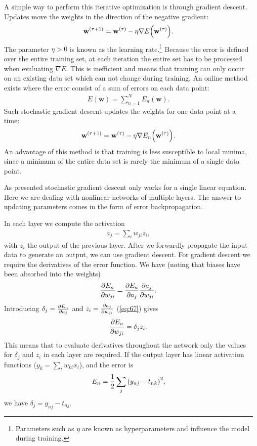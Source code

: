 \documentclass[11pt, a4paper]{report} %
\begin{document}
A simple way to perform this iterative optimization is through gradient descent.
Updates move the weights in the direction of the negative gradient:
\begin{align}
  \label{eq:63}
  \mathbf{w}^{(\tau+1)}=\mathbf{w}^{(\tau)}- \eta \nabla E\qty(\mathbf{w}^{(\tau)}).
\end{align}
The parameter \(\eta > 0\) is known as the learning rate.\footnote{Parameters such as \(\eta\) are known as hyperparameters and influence the model during training.}
Because the error is defined over the entire training set, at each iteration the entire set has to be processed when evaluating \(\nabla E\).
This is inefficient and means that training can only occur on an existing data set which can not change during training.
An online method exists where the error consist of a sum of errors on each data point:
\begin{align}
  \label{eq:64}
  E(\mathbf{w}) = \sum_{n=1}^{N} E_n(\mathbf{w}).
\end{align}
Such stochastic gradient descent updates the weights for one data point at a time:
\begin{align}
  \label{eq:65}
    \mathbf{w}^{(\tau+1)}=\mathbf{w}^{(\tau)}- \eta \nabla E_n\qty(\mathbf{w}^{(\tau)}).
\end{align}
An advantage of this method is that training is less susceptible to local minima, since a minimum of the entire data set is rarely the minimum of a single data point.

As presented stochastic gradient descent only works for a single linear equation.
Here we are dealing with nonlinear networks of multiple layers.
The answer to updating parameters comes in the form of error backpropagation.

In each layer we compute the activation
\begin{align}
  \label{eq:67}
  a_j= \sum_i w_{ji}z_i,
\end{align}
with \(z_i\) the output of the previous layer.
After we forwardly propagate the input data to generate an output, we can use gradient descent.
For gradient descent we require the derivatives of the error function.
We have (noting that biases have been absorbed into the weights)
\begin{align}
  \label{eq:66}
  \pdv{E_n}{w_{ji}} = \pdv{E_n}{a_j}\pdv{a_j}{w_{ji}}.
\end{align}
Introducing \(\delta_j = \pdv{E_n}{a_j}\) and \(z_i=\pdv{a_j}{w_{ji}}\) (\cref{eq:67}) gives
\begin{align}
  \label{eq:68}
  \pdv{E_n}{w_{ji}} = \delta_j z_i.
\end{align}
This means that to evaluate derivatives throughout the network only the values for \(\delta_j\) and \(z_i\) in each layer are required.
If the output layer has linear activation functions (\(y_k = \sum_i w_{ki}x_i\)), and the error is
\begin{align}
  \label{eq:69}
  E_n = \frac{1}{2} \sum_j {\qty(y_{nj}-t_{nk})}^2,
\end{align}
we have \(\delta_j=y_{nj}-t_{nj}\).
\end{document}
